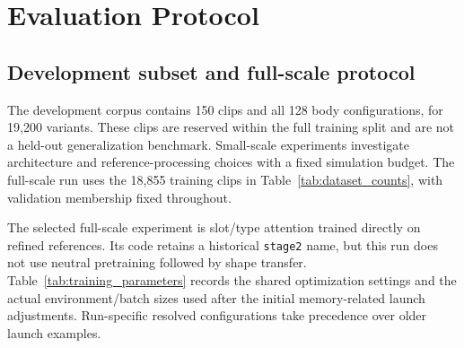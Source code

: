 \documentclass[11pt]{article}
\begin{document}
\section{Evaluation Protocol}\label{sec:experiments}

\subsection{Development subset and full-scale protocol}

The development corpus contains 150 clips and all 128 body configurations,
for 19,200 variants. These clips are reserved within the full training split
and are not a held-out generalization benchmark. Small-scale experiments
investigate architecture and reference-processing choices with a fixed
simulation budget. The full-scale run uses the 18,855 training clips in
Table~\ref{tab:dataset_counts}, with validation membership fixed throughout.

The selected full-scale experiment is slot/type attention trained directly on
refined references. Its code retains a historical \texttt{stage2} name, but
this run does not use neutral pretraining followed by shape transfer.
Table~\ref{tab:training_parameters} records the shared optimization settings
and the actual environment/batch sizes used after the initial memory-related
launch adjustments. Run-specific resolved configurations take precedence
over older launch examples.
\end{document}

